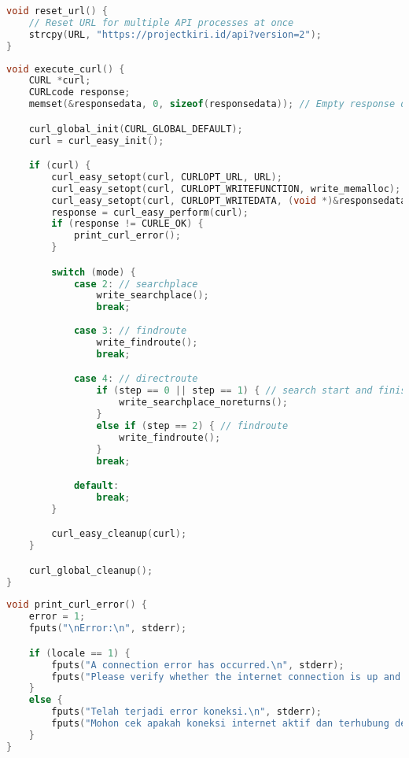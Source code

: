 \begin{lstlisting}[label={appdx:A-buildurl-reset}, language=C, caption=\texttt{reset\textunderscore url()}]
void reset_url() {
    // Reset URL for multiple API processes at once
    strcpy(URL, "https://projectkiri.id/api?version=2");
}
\end{lstlisting}

\begin{lstlisting}[label={appdx:A-curl-execute}, language=C, caption=\texttt{execute\textunderscore curl()}]
void execute_curl() {
    CURL *curl;
    CURLcode response;
    memset(&responsedata, 0, sizeof(responsedata)); // Empty response data chunk for multiprocess modes

    curl_global_init(CURL_GLOBAL_DEFAULT);
    curl = curl_easy_init();

    if (curl) {
        curl_easy_setopt(curl, CURLOPT_URL, URL);
        curl_easy_setopt(curl, CURLOPT_WRITEFUNCTION, write_memalloc);
        curl_easy_setopt(curl, CURLOPT_WRITEDATA, (void *)&responsedata);
        response = curl_easy_perform(curl);
        if (response != CURLE_OK) {
            print_curl_error();
        }

        switch (mode) {
            case 2: // searchplace
                write_searchplace();
                break;
            
            case 3: // findroute
                write_findroute();
                break;

            case 4: // directroute
                if (step == 0 || step == 1) { // search start and finish
                    write_searchplace_noreturns();
                }
                else if (step == 2) { // findroute
                    write_findroute();
                }
                break;

            default:
                break;
        }

        curl_easy_cleanup(curl);
    }

    curl_global_cleanup();
}
\end{lstlisting}

\begin{lstlisting}[label={appdx:A-curl-error}, language=C, caption=\texttt{print\textunderscore curl\textunderscore error()}]
void print_curl_error() {
    error = 1;
    fputs("\nError:\n", stderr);

    if (locale == 1) {
        fputs("A connection error has occurred.\n", stderr);
        fputs("Please verify whether the internet connection is up and running.\n", stderr);
    }
    else {
        fputs("Telah terjadi error koneksi.\n", stderr);
        fputs("Mohon cek apakah koneksi internet aktif dan terhubung dengan baik.\n", stderr);
    }
}
\end{lstlisting}

